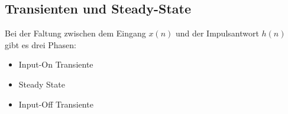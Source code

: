 	\subsection{Transienten und Steady-State}\label{Transienten und Steady-State}
		\vspace*{-0.9cm}\begin{minipage}{0.4\textwidth}
			Bei der Faltung zwischen dem Eingang $x(n)$ und der Impulsantwort $h(n)$ gibt es drei Phasen:\\[-0.3cm]
			\begin{itemize}
			\item Input-On Transiente
			\item Steady State
			\item Input-Off Transiente
			\end{itemize}
		\end{minipage}\begin{minipage}{0.03\textwidth}$ $\end{minipage}

